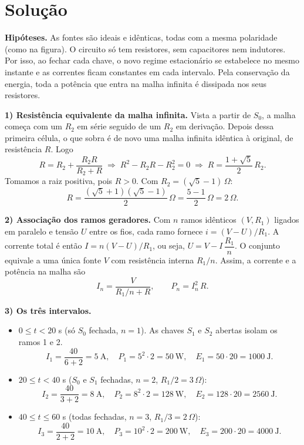 \documentclass{article}%
\begin{document}
\section*{Solução}

\textbf{Hipóteses.} As fontes são ideais e idênticas, todas com a mesma polaridade (como na figura). O circuito só tem resistores, sem capacitores nem indutores. Por isso, ao fechar cada chave, o novo regime estacionário se estabelece no mesmo instante e as correntes ficam constantes em cada intervalo. Pela conservação da energia, toda a potência que entra na malha infinita é dissipada nos seus resistores.

\textbf{1) Resistência equivalente da malha infinita.} Vista a partir de $S_0$, a malha começa com um $R_2$ em série seguido de um $R_2$ em derivação. Depois dessa primeira célula, o que sobra é de novo uma malha infinita idêntica à original, de resistência $R$. Logo
\[
R = R_2 + \frac{R_2 R}{R_2 + R}
\;\Longrightarrow\;
R^2 - R_2 R - R_2^2 = 0
\;\Longrightarrow\;
R = \frac{1+\sqrt{5}}{2}\,R_2 .
\]
Tomamos a raiz positiva, pois $R>0$. Com $R_2 = (\sqrt5 - 1)\,\Omega$:
\[
R = \frac{(\sqrt5+1)(\sqrt5-1)}{2}\,\Omega = \frac{5-1}{2}\,\Omega = 2\,\Omega .
\]

\textbf{2) Associação dos ramos geradores.} Com $n$ ramos idênticos $(V, R_1)$ ligados em paralelo e tensão $U$ entre os fios, cada ramo fornece $i = (V-U)/R_1$. A corrente total é então $I = n(V-U)/R_1$, ou seja, $U = V - I\,\dfrac{R_1}{n}$. O conjunto equivale a uma única fonte $V$ com resistência interna $R_1/n$. Assim, a corrente e a potência na malha são
\[
I_n = \frac{V}{R_1/n + R}, \qquad P_n = I_n^2\,R .
\]

\textbf{3) Os três intervalos.}
\begin{itemize}
\item $0 \le t < 20$ s (só $S_0$ fechada, $n=1$). As chaves $S_1$ e $S_2$ abertas isolam os ramos 1 e 2.
\[
I_1 = \frac{40}{6+2} = 5\ \text{A}, \quad P_1 = 5^2\cdot 2 = 50\ \text{W}, \quad E_1 = 50\cdot 20 = 1000\ \text{J}.
\]
\item $20 \le t < 40$ s ($S_0$ e $S_1$ fechadas, $n=2$, $R_1/2 = 3\,\Omega$):
\[
I_2 = \frac{40}{3+2} = 8\ \text{A}, \quad P_2 = 8^2\cdot 2 = 128\ \text{W}, \quad E_2 = 128\cdot 20 = 2560\ \text{J}.
\]
\item $40 \le t \le 60$ s (todas fechadas, $n=3$, $R_1/3 = 2\,\Omega$):
\[
I_3 = \frac{40}{2+2} = 10\ \text{A}, \quad P_3 = 10^2\cdot 2 = 200\ \text{W}, \quad E_3 = 200\cdot 20 = 4000\ \text{J}.
\]
\end{itemize}
\end{document}
